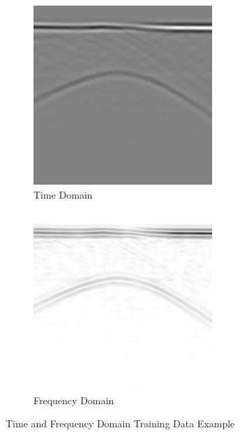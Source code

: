 \begin{figure}[H]
  \centering
  \begin{subfigure}[b]{0.45\linewidth}
    \includegraphics[width=\linewidth]{figures/peplinski_post.png}
    \caption{Time Domain}
  \end{subfigure}
  \begin{subfigure}[b]{0.45\linewidth}
    \includegraphics[width=\linewidth]{figures/frequency_post.png}
    \caption{Frequency Domain}
  \end{subfigure}
  \caption{Time and Frequency Domain Training Data Example}
  \label{fig:training_examples}
\end{figure}


